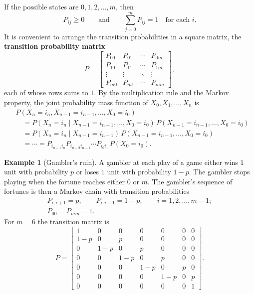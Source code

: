 \documentclass[11pt,a4paper]{article}
\theoremstyle{definition}
\newtheorem{exa}[thm]{Example}
\begin{document}
If the possible states are $0, 1, 2, \dots, m$, then
\[
P_{ij} \ge 0 \qquad\text{and}\qquad \sum_{j=0}^mP_{ij} = 1 \quad\text{for each } i .
\]
It is convenient to arrange the transition probabilities in a square matrix, the \textbf{transition probability matrix}
\[
P = \begin{bmatrix}
P_{00} & P_{01} & \cdots & P_{0m} \\
P_{10} & P_{11} & \cdots & P_{1m} \\
\vdots & \vdots & \ddots & \vdots \\
P_{m0} & P_{m1} & \cdots & P_{mm}
\end{bmatrix} ,
\]
each of whose rows sums to $1$. By the multiplication rule and the Markov property, the joint probability mass function of $X_0, X_1, \dots, X_n$ is
\begin{align*}
&P(X_n = i_n, X_{n-1} = i_{n-1}, \dots, X_0 = i_0) \\
&\quad= P(X_n = i_n \mid X_{n-1} = i_{n-1}, \dots, X_0 = i_0)\,P(X_{n-1} = i_{n-1}, \dots, X_0 = i_0) \\
&\quad= P(X_n = i_n \mid X_{n-1} = i_{n-1})\,P(X_{n-1} = i_{n-1}, \dots, X_0 = i_0) \\
&\quad= \cdots = P_{i_{n-1}i_n}P_{i_{n-2}i_{n-1}}\cdots P_{i_0i_1}\,P(X_0 = i_0) .
\end{align*}

\begin{exa}[Gambler's ruin]\label{exa:gambler-chain}
A gambler at each play of a game either wins $1$ unit with probability $p$ or loses $1$ unit with probability $1 - p$. The gambler stops playing
when the fortune reaches either $0$ or $m$. The gambler's sequence of fortunes is then a Markov chain with transition probabilities
\begin{gather*}
P_{i,i+1} = p , \qquad P_{i,i-1} = 1 - p , \qquad i = 1, 2, \dots, m - 1 ; \\
P_{00} = P_{mm} = 1 .
\end{gather*}
For $m = 6$ the transition matrix is
\[
P = \begin{bmatrix}
1 & 0 & 0 & 0 & 0 & 0 & 0 \\
1-p & 0 & p & 0 & 0 & 0 & 0 \\
0 & 1-p & 0 & p & 0 & 0 & 0 \\
0 & 0 & 1-p & 0 & p & 0 & 0 \\
0 & 0 & 0 & 1-p & 0 & p & 0 \\
0 & 0 & 0 & 0 & 1-p & 0 & p \\
0 & 0 & 0 & 0 & 0 & 0 & 1
\end{bmatrix} .
\]
\end{exa}
\end{document}
